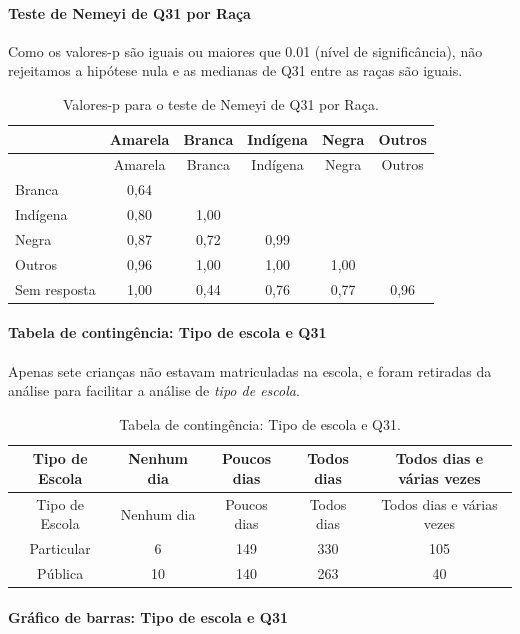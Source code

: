 \documentclass[]{article}
\let\oldparagraph\paragraph
\renewcommand{\paragraph}[1]{\oldparagraph{#1}\mbox{}}
\begin{document}
\hypertarget{teste-de-nemeyi-de-q31-por-rauxe7a}{%
\paragraph{Teste de Nemeyi de Q31 por Raça}\label{teste-de-nemeyi-de-q31-por-rauxe7a}}

Como os valores-p são iguais ou maiores que 0.01 (nível de significância), não rejeitamos a hipótese nula e as medianas de Q31 entre as raças são iguais.

\begin{longtable}[]{@{}lccccc@{}}
\caption{\label{tab:unnamed-chunk-1054}Valores-p para o teste de Nemeyi de Q31 por Raça.}\tabularnewline
\toprule
& Amarela & Branca & Indígena & Negra & Outros\tabularnewline
\midrule
\endfirsthead
\toprule
& Amarela & Branca & Indígena & Negra & Outros\tabularnewline
\midrule
\endhead
Branca & 0,64 & & & &\tabularnewline
Indígena & 0,80 & 1,00 & & &\tabularnewline
Negra & 0,87 & 0,72 & 0,99 & &\tabularnewline
Outros & 0,96 & 1,00 & 1,00 & 1,00 &\tabularnewline
Sem resposta & 1,00 & 0,44 & 0,76 & 0,77 & 0,96\tabularnewline
\bottomrule
\end{longtable}

\cleardoublepage

\hypertarget{tabela-de-continguxeancia-tipo-de-escola-e-q31}{%
\paragraph{Tabela de contingência: Tipo de escola e Q31}\label{tabela-de-continguxeancia-tipo-de-escola-e-q31}}

Apenas sete crianças não estavam matriculadas na escola, e foram retiradas da análise para facilitar a análise de \emph{tipo de escola}.

\begin{longtable}[]{@{}ccccc@{}}
\caption{\label{tab:unnamed-chunk-1055}Tabela de contingência: Tipo de escola e Q31.}\tabularnewline
\toprule
Tipo de Escola & Nenhum dia & Poucos dias & Todos dias & Todos dias e várias vezes\tabularnewline
\midrule
\endfirsthead
\toprule
Tipo de Escola & Nenhum dia & Poucos dias & Todos dias & Todos dias e várias vezes\tabularnewline
\midrule
\endhead
Particular & 6 & 149 & 330 & 105\tabularnewline
Pública & 10 & 140 & 263 & 40\tabularnewline
\bottomrule
\end{longtable}

\hypertarget{gruxe1fico-de-barras-tipo-de-escola-e-q31}{%
\paragraph{Gráfico de barras: Tipo de escola e Q31}\label{gruxe1fico-de-barras-tipo-de-escola-e-q31}}
\end{document}
